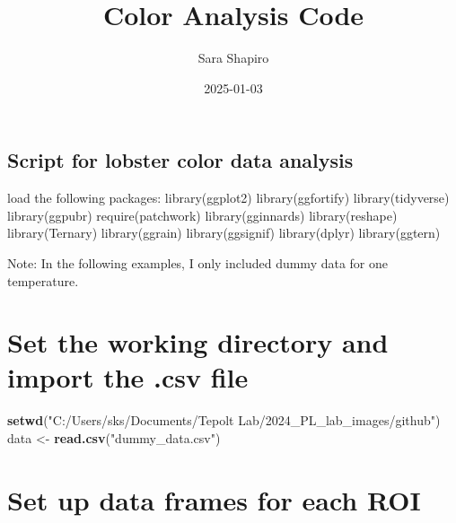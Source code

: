 \documentclass[
]{article}
\title{Color Analysis Code}
\author{Sara Shapiro}
\date{2025-01-03}
\newenvironment{Shaded}{\begin{snugshade}}{\end{snugshade}}
\newcommand{\FunctionTok}[1]{\textcolor[rgb]{0.13,0.29,0.53}{\textbf{#1}}}
\newcommand{\NormalTok}[1]{#1}
\newcommand{\OtherTok}[1]{\textcolor[rgb]{0.56,0.35,0.01}{#1}}
\newcommand{\StringTok}[1]{\textcolor[rgb]{0.31,0.60,0.02}{#1}}
\begin{document}
\maketitle

\subsection{Script for lobster color data
analysis}\label{script-for-lobster-color-data-analysis}

load the following packages: library(ggplot2) library(ggfortify)
library(tidyverse) library(ggpubr) require(patchwork) library(gginnards)
library(reshape) library(Ternary) library(ggrain) library(ggsignif)
library(dplyr) library(ggtern)

Note: In the following examples, I only included dummy data for one
temperature.

\section{Set the working directory and import the .csv
file}\label{set-the-working-directory-and-import-the-.csv-file}

\begin{Shaded}
\begin{Highlighting}[]
\FunctionTok{setwd}\NormalTok{(}\StringTok{"C:/Users/sks/Documents/Tepolt Lab/2024\_PL\_lab\_images/github"}\NormalTok{)}
\NormalTok{data }\OtherTok{\textless{}{-}} \FunctionTok{read.csv}\NormalTok{(}\StringTok{"dummy\_data.csv"}\NormalTok{)}
\end{Highlighting}
\end{Shaded}

\section{Set up data frames for each
ROI}\label{set-up-data-frames-for-each-roi}
\end{document}
